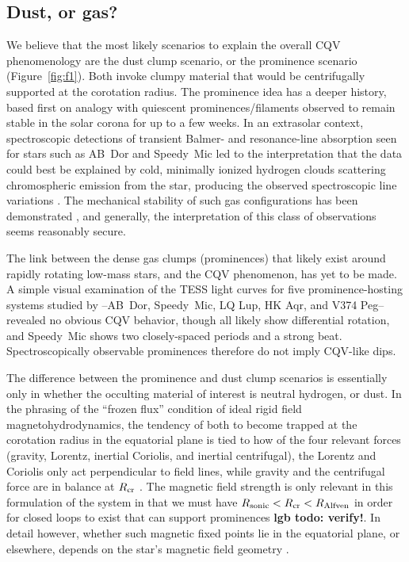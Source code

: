 \documentclass[11pt,twocolumn,tighten]{aastex63}
\begin{document}
\subsection{Dust, or gas?}

We believe that the most likely scenarios to explain the overall CQV phenomenology
are the dust clump scenario, or the
prominence scenario (Figure~\ref{fig:f1}).
Both invoke clumpy material that would be centrifugally supported at the corotation radius.
The prominence idea has a deeper history,
based first on analogy with quiescent prominences/filaments
observed to remain stable in the solar corona for up to a few weeks.
In an extrasolar context,
spectroscopic detections of transient Balmer- and
resonance-line absorption seen for stars such as AB~Dor and
Speedy~Mic \citep[e.g.][]{1989MNRAS.238..657C,1993MNRAS.262..369J,2006MNRAS.365..530D,2016MNRAS.463..965L}
led to the interpretation that the data could best be explained by
cold, minimally ionized hydrogen clouds scattering chromospheric emission from the star,
producing the observed spectroscopic line variations \citep[see][]{1989MNRAS.238..657C}. 
The mechanical stability of such gas configurations has been
demonstrated \citep{2000MNRAS.316..647F,2022MNRAS.514.5465W}, and generally, the interpretation
of this class of observations seems reasonably secure.

The link between the dense gas clumps (prominences) that 
likely exist around rapidly rotating low-mass stars,
and the CQV phenomenon, has yet to be made.
A simple visual examination of the TESS light curves for 
five prominence-hosting systems
studied by \citet{2019MNRAS.482.2853J}--AB~Dor, Speedy~Mic, LQ Lup, HK Aqr, and V374 Peg--revealed
no obvious CQV behavior, though all likely show
differential rotation, and
Speedy~Mic shows two closely-spaced periods and
a strong beat.
Spectroscopically observable prominences therefore do not imply CQV-like dips.

The difference between the prominence and dust clump scenarios
is essentially only in whether the occulting material of
interest is neutral hydrogen, or dust.  In the phrasing of the
``frozen flux'' condition of ideal rigid field magnetohydrodynamics,
the tendency of both to become trapped at the corotation radius in the
equatorial plane is tied to how of the four relevant forces (gravity,
Lorentz, inertial Coriolis, and inertial centrifugal), the Lorentz and
Coriolis only act perpendicular to field lines, while gravity and the
centrifugal force are in balance at $R_{\rm cr}$
\citep[see][Sec.~2]{2005MNRAS.357..251T}.
The magnetic field strength is only relevant in this formulation of
the system in that we must have $R_{\rm sonic} < R_{\rm cr} < R_{\rm Alfven}$ in order for 
closed loops to exist that can support prominences 
\citep{2019MNRAS.482.2853J} {\bf lgb todo: verify!}.
In detail however, whether such magnetic fixed points lie in the equatorial
plane, or elsewhere, depends on the star's magnetic field geometry
\citep{2023MNRAS.518.4734S}.
\end{document}
